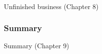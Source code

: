 Unfinished business (Chapter 8)

\subsubsection{Summary}
\label{sec:summary}

Summary (Chapter 9)







%
%




